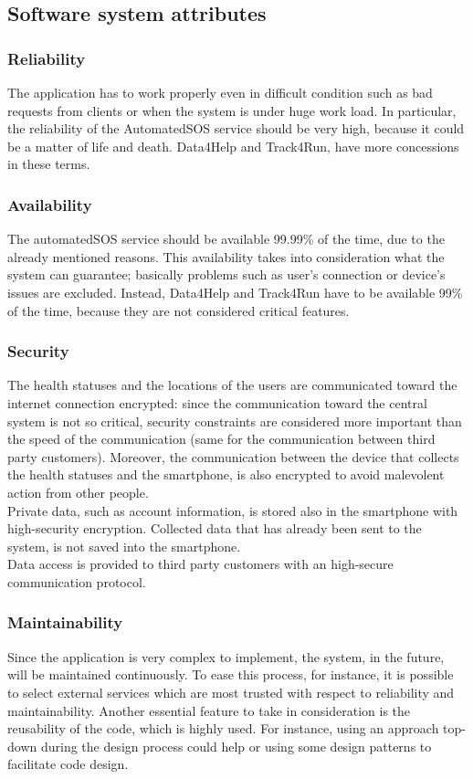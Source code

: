 \subsection{Software system attributes}
\subsubsection{Reliability}
The application has to work properly even in difficult condition such as bad requests from clients or when the system is under huge work load. In particular, the reliability of the AutomatedSOS service should be very high, because it could be a matter of life and death. Data4Help and Track4Run, have more concessions in these terms.

\subsubsection{Availability}
The automatedSOS service should be available 99.99\% of the time, due to the already mentioned reasons. This availability takes into consideration what the system can guarantee; basically problems such as user's connection or device's issues are excluded. Instead, Data4Help and Track4Run have to be available 99\% of the time, because they are not considered critical features.  

\subsubsection{Security}
The health statuses and the locations of the users are communicated toward the internet connection encrypted: since the communication toward the central system is not so critical, security constraints are considered more important than the speed of the communication (same for the communication between third party customers). Moreover, the communication between the device that collects the health statuses and the smartphone, is also encrypted to avoid malevolent action from other people. \\ 
Private data, such as account information, is stored also in the smartphone with high-security encryption. Collected data that has already been sent to the system, is not saved into the smartphone. \\
Data access is provided to third party customers with an high-secure communication protocol.

\subsubsection{Maintainability}
Since the application is very complex to implement, the system, in the future, will be maintained continuously. To ease this process, for instance, it is possible to select external services which are most trusted with respect to reliability and maintainability. Another essential feature to take in consideration is the reusability of the code, which is highly used. For instance, using an approach top-down during the design process could help or using some design patterns to facilitate code design.

